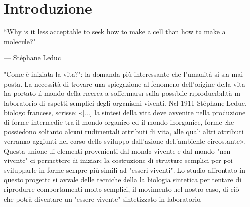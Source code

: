 \chapter{Introduzione}
\vspace{0.5cm}

\label{cha:intro}
\epigraph{“Why is it less acceptable to seek how to make a cell than how to make a molecule?"}{--- \textup{Stéphane Leduc}}

"Come è iniziata la vita?": la domanda più interessante che l'umanità si sia mai posta. La necessità di trovare una spiegazione al fenomeno dell'origine della vita ha portato il mondo della ricerca a soffermarsi sulla possibile riproducibilità in laboratorio di aspetti semplici degli organismi viventi. 
Nel 1911 Stéphane Leduc, biologo francese, scrisse: «[...] la sintesi della vita deve avvenire nella produzione di forme intermedie tra il mondo organico ed il mondo inorganico, forme che possiedono soltanto alcuni rudimentali attributi di vita, alle quali altri attributi verranno aggiunti nel corso dello sviluppo dall'azione dell'ambiente circostante». Questa unione di elementi provenienti dal mondo vivente e dal mondo "non vivente" ci permettere di iniziare la costruzione di strutture semplici per poi svilupparle in forme sempre più simili ad "esseri viventi". 
Lo studio affrontato in questo progetto si avvale delle tecniche della la biologia sintetica per tentare di riprodurre comportamenti molto semplici, il movimento nel nostro caso, di ciò che potrà diventare un "essere vivente" sintetizzato in laboratorio.


